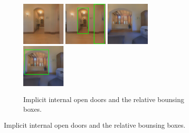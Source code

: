 \begin{figure}[h!]
	\centering
	\begin{subfigure}[b]{\linewidth}
		\centering
		\includegraphics[width=0.24\textwidth]{images/implicitdoor1.png}
		\hfill
		\includegraphics[width=0.24\textwidth]{images/implicitdoor1boxed.png}
		\hfill
		\includegraphics[width=0.24\textwidth]{images/implicitdoor2.png}
		\hfill
		\includegraphics[width=0.24\textwidth]{images/implicitdoor2boxed.png}
		\caption{Implicit internal open doors and the relative bounsing boxes.}
	\end{subfigure}


\end{figure}
